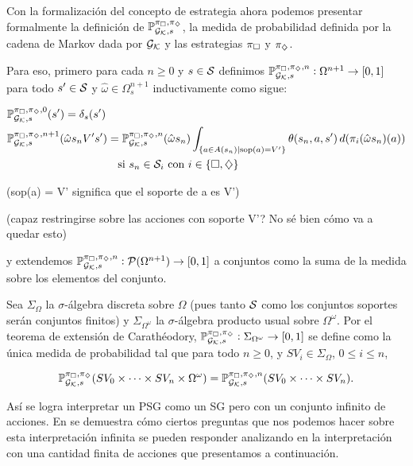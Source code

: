 \begin{boxamarillo}{}
	Con la formalización del concepto de estrategia ahora podemos presentar
	formalmente la definición de $\mathbb{P}_{\mathcal{G}_{\mathcal{K}}, s}^{\pi_\square, \pi_\diamondsuit}$, la medida de probabilidad definida por
	la cadena de Markov dada por $\mathcal{G}_{\mathcal{K}}$ y las estrategias $\pi_\square$ y $\pi_\diamondsuit$.

	Para eso, primero para cada $n \geq 0$ y $s \in \mathcal{S}$ definimos $\mathbb{P}^{\pi_\square,
			\pi_\diamondsuit, n}_{\mathcal{G}_{\mathcal{K}}, s} : \Omega^{n+1} \rightarrow [0, 1]$ para todo $s' \in \mathcal{S}$
	y $\hat{\omega} \in \Omega_s^{n+1}$ inductivamente como sigue:

	\begin{align*}
		&\mathbb{P}^{\pi_\square, \pi_\diamondsuit, 0}_{\mathcal{G}_{\mathcal{K}}, s}(s') = \delta_s(s') \\
		&\mathbb{P}^{\pi_\square, \pi_\diamondsuit, n+1}_{\mathcal{G}_{\mathcal{K}}, s}(\hat{\omega}s_nV's') = \mathbb{P}^{\pi_\square, \pi_\diamondsuit, n}_{\mathcal{G}_{\mathcal{K}}, s}(\hat{\omega} s_n) \int_{\{ a \in A(s_n) \mid \text{sop}(a) = V'\}} \theta(s_n, a, s') \, d(\pi_i(\hat{\omega}s_n)(a)) \\ & \qquad \qquad \qquad \qquad \qquad \text{si } s_n \in \mathcal{S}_i \text{ con } i \in \{\square, \diamondsuit\}
	\end{align*}

	(sop(a) = V' significa que el soporte de a es V')

	(capaz restringirse sobre las acciones con soporte V'? No sé bien cómo va a quedar esto)

	y extendemos \( \mathbb{P}^{\pi_\square, \pi_\diamondsuit, n}_{\mathcal{G}_{\mathcal{K}}, s} :
	\mathcal{P}(\Omega^{n+1}) \to [0, 1] \) a conjuntos como la suma de la medida
	sobre los elementos del conjunto.

	Sea \( \Sigma_\Omega \) la \( \sigma \)-álgebra discreta sobre \( \Omega \)
	(pues tanto $\mathcal{S}$ como los conjuntos soportes serán conjuntos finitos) y \(
	\Sigma_{\Omega^\omega} \) la \( \sigma \)-álgebra producto usual sobre \(
	\Omega^\omega \). Por el teorema de extensión de Carathéodory, \(
	\mathbb{P}^{\pi_\square, \pi_\diamondsuit}_{\mathcal{G}_{\mathcal{K}}, s} : \Sigma_{\Omega^\omega} \to [0, 1] \) se
	define como la única medida de probabilidad tal que para todo \( n \geq 0 \), y
	\( SV_i \in \Sigma_\Omega \), \( 0 \leq i \leq n \),

	\[
		\mathbb{P}^{\pi_\square, \pi_\diamondsuit}_{\mathcal{G}_{\mathcal{K}}, s}(SV_0 \times \dots \times SV_n \times \Omega^\omega) = \mathbb{P}^{\pi_\square, \pi_\diamondsuit, n}_{\mathcal{G}_{\mathcal{K}}, s}(SV_0 \times \dots \times SV_n).
	\]
\end{boxamarillo}

Así se logra interpretar un PSG como un SG pero con un conjunto infinito de
acciones. En \cite{Polytopal} se demuestra cómo ciertos preguntas que nos
podemos hacer sobre esta interpretación infinita se pueden responder analizando
en la interpretación con una cantidad finita de acciones que presentamos a
continuación.

